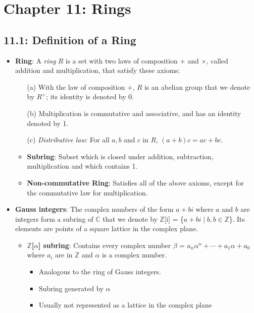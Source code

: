 \documentclass[12pt]{article}
\begin{document}
\section*{Chapter 11: Rings}

\subsection*{11.1: Definition of a Ring}
\begin{itemize}
  \item \textbf{Ring}: A \textit{ring} $R$ is a set with two laws of composition $+$ and $\times$, called addition and multiplication, that satisfy these axioms:
  \begin{enumerate}
    \item[(a)] With the law of composition $+$, $R$ is an abelian group that we denote by $R^+$; its identity is denoted by 0.
    \item[(b)] Multiplication is commutative and associative, and has an identity denoted by 1.
    \item[(c)] \textit{Distributive law}: For all $a, b$ and $c$ in $R$, $(a + b)c = ac + bc$.
  \end{enumerate}
  \begin{itemize}
    \item \textbf{Subring}: Subset which is closed under addition, subtraction, multiplication and which contains 1.
    \item \textbf{Non-commutative Ring}: Satisfies all of the above axioms, except for the commutative law for multiplication.
  \end{itemize}
  \item \textbf{Gauss integers}: The complex numbers of the form $a + bi$ where $a$ and $b$ are integers form a subring of $\mathbb{C}$ that we denote by $\mathbb{Z}$[i] = \{$a + bi \mid b, b \in \mathbb{Z}$\}. Its elements are points of a square lattice in the complex plane.
  \begin{itemize}
    \item \textbf{$\mathbb{Z}$[$\alpha$] subring}: Contains every complex number $\beta$ = $a_n\alpha^n + \cdots + a_1\alpha + a_0$ where $a_i$ are in $\mathbb{Z}$ and $\alpha$ is a complex number.
    \begin{itemize}
      \item Analogous to the ring of Gauss integers.
      \item Subring generated by $\alpha$
      \item Usually not represented as a lattice in the complex plane

\end{itemize}
\end{itemize}
\end{itemize}
\end{document}
